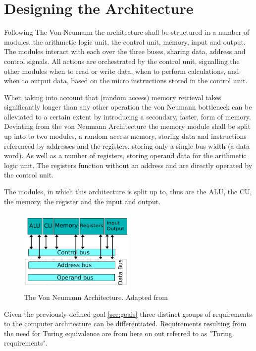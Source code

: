 \chapter{Designing the Architecture}
Following The Von Neumann the architecture shall be structured in a number of modules, the arithmetic logic unit, the control unit, memory, input and output. The modules interact with each over the three buses, sharing data, address and control signals. All actions are orchestrated by the control unit, signalling the other modules when to read or write data, when to perform calculations, and when to output data, based on the micro instructions stored in the control unit.

When taking into account that (random access) memory retrieval takes significantly longer than any other operation the von Neumann bottleneck can be alleviated to a certain extent by introducing a secondary, faster, form of memory. Deviating from the von Neumann Architecture the memory module shall be split up into to two modules, a random access memory, storing data and instructions referenced by addresses and the registers, storing only a single bus width (a data word). As well as a number of registers, storing operand data for the arithmetic logic unit. The registers function without an address and are directly operated by the control unit.

The modules, in which this architecture is split up to, thus are the ALU, the CU, the memory, the register
and the input and output.
\begin{figure}[H]
  \begin{center}
    \includegraphics[width=0.5\textwidth]{figures/VNA-Adapted}
  \end{center}
  \caption{The Von Neumann Architecture. Adapted from \cite{fig-vna}}\label{fig:vna-adapted}
\end{figure}


Given the previously defined goal \ref{sec:goals} three distinct groups of requirements to the computer architecture can be differentiated. Requirements resulting from the need for Turing equivalence are from here on out referred to as "Turing requirements".

